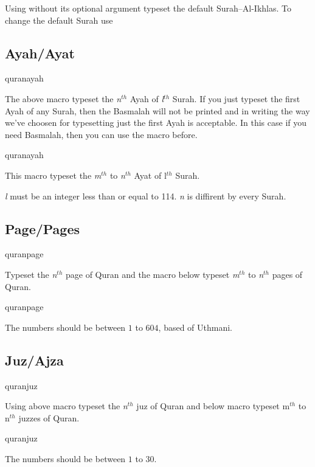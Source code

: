 \documentclass{ltxdoc}
\begin{document}
Using  without its optional argument typeset the default Surah--Al-Ikhlas.
To change the default Surah use 

\subsection{Ayah/Ayat}
\begin{declcs}{quranayah}
\end{declcs}
The above macro typeset the \textit{n}$^{th}$ Ayah of \textit{l}$^{th}$ Surah. 
If you just typeset the first Ayah of any Surah, then the Basmalah will not be printed and in writing the way 
we've choosen for typesetting just the first Ayah is acceptable. In this case if you need Basmalah, then 
you can use the  macro before.

\begin{declcs}{quranayah}
\end{declcs}
This macro typeset the \textit{m}$^{th}$ to \textit{n}$^{th}$ Ayat of l$^{th}$ Surah. 

\textit{l} must be an integer less than or equal to 114. \textit{n} is diffirent by every Surah. 

\subsection{Page/Pages}
\begin{declcs}{quranpage}
\end{declcs}
Typeset the \textit{n}$^{th}$ page of Quran and the macro below typeset \textit{m}$^{th}$ to 
\textit{n}$^{th}$ pages of Quran. 

\begin{declcs}{quranpage}
\end{declcs}
The numbers should be between $1$ to $604$, based of Uthmani. 

\subsection{Juz/Ajza}
\begin{declcs}{quranjuz}
\end{declcs}
Using above macro typeset the \textit{n}$^{th}$ juz of Quran and below macro typeset m$^{th}$ to n$^{th}$ juzzes of Quran. 
\begin{declcs}{quranjuz}
\end{declcs}
The numbers should be between $1$ to $30$.
\end{document}
